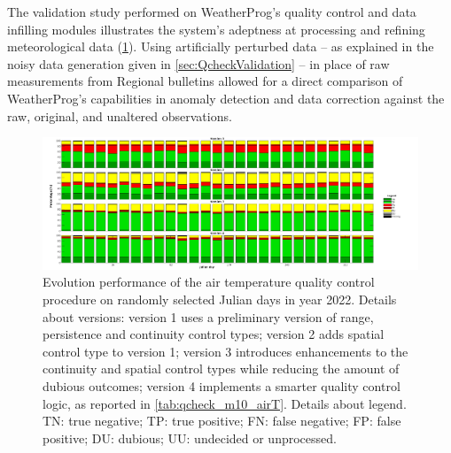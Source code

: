 \documentclass[authoryear,preprint,review,12pt]{elsarticle}
\begin{document}
The validation study performed on WeatherProg's quality control and data infilling modules illustrates the system's adeptness at processing and refining meteorological data (\cref{fig:perturbationCharts}).
Using artificially perturbed data -- as explained in the noisy data generation given in \cref{sec:QcheckValidation} -- in place of raw measurements from Regional bulletins allowed for a direct comparison of WeatherProg's capabilities in anomaly detection and data correction against the raw, original, and unaltered observations.

\begin{figure}
	\centering
	\includegraphics[scale=.30]{figures/Fig_qck_versions_v2.tif}
	\caption{ Evolution performance of the air temperature quality control procedure on randomly selected Julian days in year 2022.
    Details about versions: version 1 uses a preliminary version of range, persistence and continuity control types; version 2 adds spatial control type to version 1; version 3 introduces enhancements to the continuity and spatial control types while reducing the amount of dubious outcomes; version 4 implements a smarter quality control logic, as reported in \cref{tab:qcheck_m10_airT}.
    Details about legend. TN: true negative; TP: true positive; FN: false negative; FP: false positive; DU: dubious; UU: undecided or unprocessed. }
	\label{fig:perturbationCharts}
\end{figure}
\end{document}

